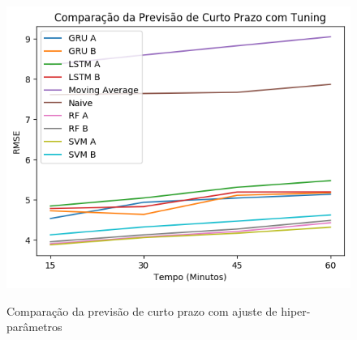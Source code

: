 \begin{figure}[H]
    \centering
    \includegraphics[scale=0.9]{monography/img/comparisons/comparacao_da_previsao_de_curto_prazo_com_tuning_rmse.png}
    \label{figure:pred_tuning}
    \caption{Comparação da previsão de curto prazo com ajuste de hiper-parâmetros}
\end{figure}

